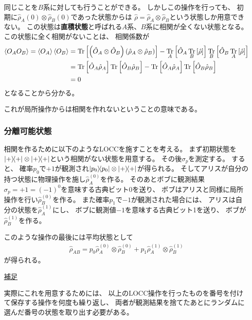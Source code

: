 \documentclass[a4paper, 10pt]{jsarticle}
\begin{document}
同じことを$B$系に対しても行うことができる。
しかしこの操作を行っても、
初期に$\hat{\rho}_A (0) \otimes \hat{\rho}_B (0)$であった状態からは
$\hat{\rho} = \hat{\rho}_A \otimes \hat{\rho}_B$という状態しか用意できない。
この状態は\textbf{直積状態}と呼ばれる$A$系、$B$系に相関が全くない状態となる。
この状態に全く相関がないことは、
相関係数が
\begin{align}
	\Braket{O_A O_B} = \Braket{O_A} \Braket{O_B}
	&= \operatorname*{Tr} \left[ \left( \hat{O}_A \otimes \hat{O}_B \right)
	\left( \hat{\rho}_A \otimes \hat{\rho}_B \right) \right]
	- \operatorname*{Tr}_A \left[ \hat{O}_A \operatorname*{Tr}_B \left[ \hat{\rho} \right] \right]
	\operatorname*{Tr}_B \left[ \hat{O}_B \operatorname*{Tr}_A \left[ \hat{\rho} \right] \right] \\
	&= \operatorname*{Tr} \left[ \hat{O}_A \hat{\rho}_A \right]
	\operatorname*{Tr} \left[ \hat{O}_B \hat{\rho}_B \right]
	- \operatorname*{Tr} \left[ \hat{O}_A \hat{\rho}_A \right]
	\operatorname*{Tr} \left[ \hat{O}_B \hat{\rho}_B \right] \\
	&= 0
\end{align}
となることから分かる。

これが局所操作からは相関を作れないということの意味である。

\subsubsection{分離可能状態}
相関を作るために以下のようなLOCCを施すことを考える。
まず初期状態を
$\Ket{+} \! \! \Bra{+} \otimes \Ket{+} \! \! \Bra{+}$という相関がない状態を用意する。
その後$\sigma_p$を測定する。
すると、
確率$p_0$で$+1$が観測され$\Ket{p_0} \! \! \Bra{p_0} \otimes \Ket{+} \! \! \Bra{+}$が得られる。
そしてアリスが自分の持つ状態に物理操作を施し$\hat{\rho}^{(0)}_A$を作る。
そのあとボブに観測結果$\sigma_p = +1 = (-1)^0$を意味する古典ビット0を送り、
ボブはアリスと同様に局所操作を行い$\hat{\rho}^{(0)}_B$を作る。
また確率$p_1$で$-1$が観測された場合には、
アリスは自分の状態を$\hat{\rho}^{(1)}_A$にし、
ボブに観測値$-1$を意味する古典ビット1を送り、
ボブが$\hat{\rho}^{(1)}_B$を作る。

このような操作の最後には平均状態として
\begin{align}
	\hat{\rho}_{AB}
	= p_0 \hat{\rho}^{(0)}_A \otimes \hat{\rho}^{(0)}_B
	+ p_1 \hat{\rho}^{(1)}_A \otimes \hat{\rho}^{(1)}_B
	\label{eq:LOCC1}
\end{align}
が得られる。

\begin{tcolorbox}[
enhanced,
colback = white,
boxrule = 0.5pt,
arc=2mm,
breakable
]
	\underline{補足}

	実際にこれを用意するためには、
	以上のLOCC操作を行ったものを番号を付けて保存する操作を何度も繰り返し、
	両者が観測結果を捨てたあとにランダムに選んだ番号の状態を取り出す必要がある。
\end{tcolorbox}
\end{document}
